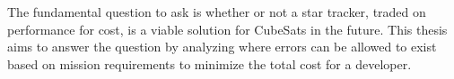 \par \qquad The fundamental question to ask is whether or not a star tracker, traded on performance for cost, is a viable solution for CubeSats in the future.
This thesis aims to answer the question by analyzing where errors can be allowed to exist based on mission requirements to minimize the total cost for a developer.



